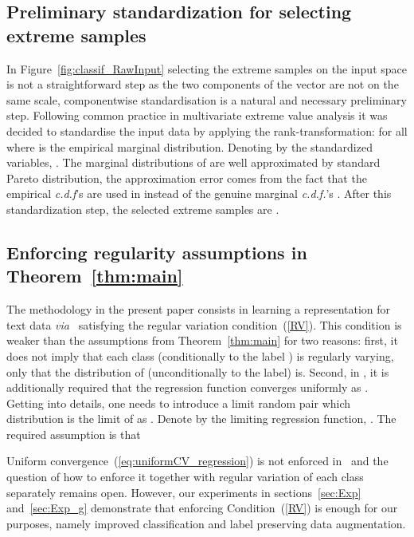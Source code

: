 \subsection{Preliminary standardization for selecting extreme samples} In Figure~\ref{fig:classif_RawInput} selecting the extreme samples on the input space is not a straightforward step as the two components of the vector are not on the same scale, componentwise standardisation is a natural and necessary preliminary step. Following common practice in multivariate extreme value analysis it was decided to standardise the input data  by applying the rank-transformation:  for all  where  is the  empirical marginal distribution.
Denoting by  the standardized variables, .  The marginal distributions of  are well approximated by  standard Pareto distribution, the approximation error comes from the fact that the empirical \emph{c.d.f}'s are used in  instead of the genuine marginal \emph{c.d.f.}'s . After this standardization step, the selected extreme samples are  . 
\subsection{Enforcing regularity assumptions in Theorem~\ref{thm:main}}\label{sec:unifCV_app}
The methodology in the  present paper consists in learning a representation  for text data \emph{via} \HTalgo\ satisfying the regular variation  condition~(\ref{RV}). This condition   is weaker than the assumptions from Theorem~\ref{thm:main} for two reasons: first, it does not imply that  each class (conditionally to the label ) is regularly varying, only that the distribution of   (unconditionally to the label) is. Second, 
in \citet{jalalzai2018binary}, it is additionally required that the regression function  converges uniformly as . Getting into details, one needs to introduce a limit random pair  which distribution is the limit of  as . Denote by  the limiting regression function, . The required assumption is that 

Uniform convergence~(\ref{eq:uniformCV_regression}) is not enforced in \HTalgo\, and the question of how to enforce it together with regular variation of each class separately remains open.  However, our experiments in sections~\ref{sec:Exp} and~\ref{sec:Exp_g} demonstrate  that enforcing  Condition~(\ref{RV})  is enough for our purposes,  namely improved classification and label preserving data augmentation.  
 
 
